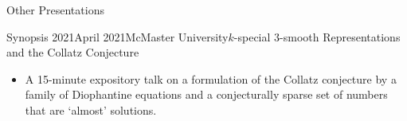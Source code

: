 \begin{rSection}{Other Presentations}

\begin{rSubsection}{Synopsis 2021}{April 2021}{McMaster University}{$k$-special $3$-smooth Representations and the Collatz Conjecture}
    \begin{itemize}
      \addtolength\itemsep{-0.5em}
      \item A 15-minute expository talk on a formulation of the Collatz conjecture by a family of Diophantine equations and a conjecturally sparse set of numbers that are `almost' solutions.
    \end{itemize}
\end{rSubsection}
\smallskip







\end{rSection}
